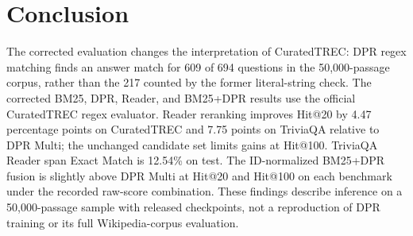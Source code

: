 \section{Conclusion}
The corrected evaluation changes the interpretation of CuratedTREC: DPR regex matching finds an answer match for 609 of 694 questions in the 50,000-passage corpus, rather than the 217 counted by the former literal-string check. The corrected BM25, DPR, Reader, and BM25+DPR results use the official CuratedTREC regex evaluator. Reader reranking improves Hit@20 by 4.47 percentage points on CuratedTREC and 7.75 points on TriviaQA relative to DPR Multi; the unchanged candidate set limits gains at Hit@100. TriviaQA Reader span Exact Match is 12.54\% on test. The ID-normalized BM25+DPR fusion is slightly above DPR Multi at Hit@20 and Hit@100 on each benchmark under the recorded raw-score combination. These findings describe inference on a 50,000-passage sample with released checkpoints, not a reproduction of DPR training or its full Wikipedia-corpus evaluation.
